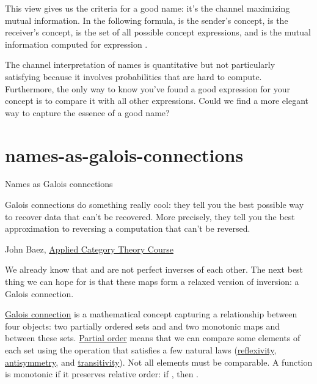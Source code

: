 \documentclass{article}
\begin{document}
This view gives us the criteria for a good name:
it's the channel maximizing mutual information.
In the following formula,
 is the sender's concept,
 is the receiver's concept,
 is the set of all possible concept expressions,
and
is the mutual information computed for expression .


The channel interpretation of names is quantitative but not particularly satisfying because it involves probabilities that are hard to compute.
Furthermore, the only way to know you've found a good expression for your concept is to compare it with all other expressions.
Could we find a more elegant way to capture the essence of a good name?

\section{names-as-galois-connections}{Names as Galois connections}
\epigraph{
  Galois connections do something really cool: they tell you the best possible way to recover data that can't be recovered.
  More precisely, they tell you the best approximation to reversing a computation that can't be reversed.
}{John Baez, \href{https://math.ucr.edu/home/baez/act_course/lecture_5.html}{Applied Category Theory Course}}

We already know that  and  are not perfect inverses of each other.
The next best thing we can hope for is that these maps form a relaxed version of inversion: a Galois connection.

\href{https://en.wikipedia.org/wiki/Galois_connection}{Galois connection}
is a mathematical concept capturing a relationship between four objects:
two partially ordered sets  and 
and two monotonic maps  and  between these sets.
\href{https://en.wikipedia.org/wiki/Partially_ordered_set#Partial_orders}{Partial order}
means that we can compare some elements of each set using the \mathml{\mo{\leq}} operation that satisfies a few natural laws
(\href{https://en.wikipedia.org/wiki/Reflexive_relation}{reflexivity},
\href{https://en.wikipedia.org/wiki/Antisymmetric_relation}{antisymmetry},
and \href{https://en.wikipedia.org/wiki/Transitive_relation}{transitivity}).
Not all elements must be comparable.
A function  is monotonic if it preserves relative order:
if ,
then .
\end{document}
